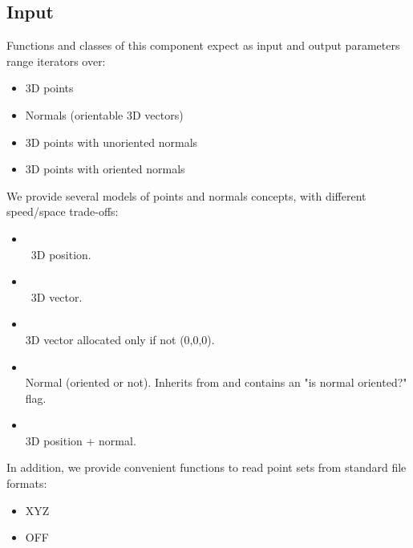\subsection{Input}

Functions and classes of this component expect as input and output parameters range iterators over:

\begin{itemize}
\item 3D points
\item Normals (orientable 3D vectors)
\item 3D points with unoriented normals
\item 3D points with oriented normals
\end{itemize}

We provide several models of points and normals concepts, with different speed/space trade-offs:

\begin{itemize}
\item {} \\
\cgal\ 3D position.
\item {} \\
\cgal\ 3D vector.
\item {} \\
3D vector allocated only if not (0,0,0).
\item {} \\
Normal (oriented or not).
Inherits from  and contains an "is normal oriented?" flag.
\item {} \\
3D position + normal.
\end{itemize}

In addition, we provide convenient functions to read point sets from standard file formats:

\begin{itemize}
\item XYZ
\item OFF
\end{itemize}

  \\
  \\

